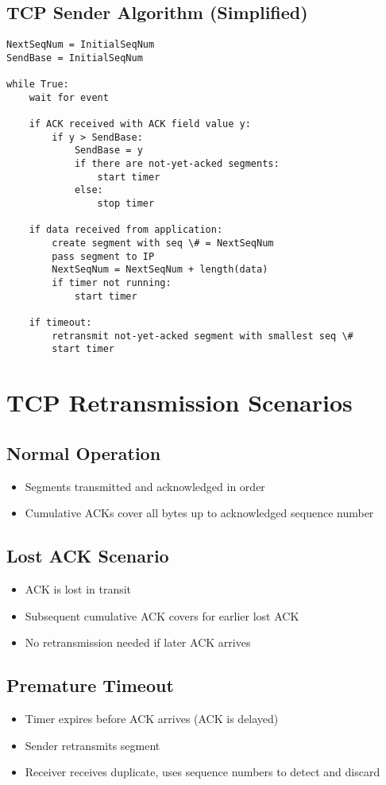 \documentclass[12pt]{article}
\begin{document}
\subsection{TCP Sender Algorithm (Simplified)}
\begin{verbatim}
NextSeqNum = InitialSeqNum
SendBase = InitialSeqNum

while True:
    wait for event
    
    if ACK received with ACK field value y:
        if y > SendBase:
            SendBase = y
            if there are not-yet-acked segments:
                start timer
            else:
                stop timer
                
    if data received from application:
        create segment with seq \# = NextSeqNum
        pass segment to IP
        NextSeqNum = NextSeqNum + length(data)
        if timer not running:
            start timer
            
    if timeout:
        retransmit not-yet-acked segment with smallest seq \#
        start timer
\end{verbatim}


\section{TCP Retransmission Scenarios}

\subsection{Normal Operation}
\begin{itemize}
    \item Segments transmitted and acknowledged in order
    \item Cumulative ACKs cover all bytes up to acknowledged sequence number
\end{itemize}

\subsection{Lost ACK Scenario}
\begin{itemize}
    \item ACK is lost in transit
    \item Subsequent cumulative ACK covers for earlier lost ACK
    \item No retransmission needed if later ACK arrives
\end{itemize}

\subsection{Premature Timeout}
\begin{itemize}
    \item Timer expires before ACK arrives (ACK is delayed)
    \item Sender retransmits segment
    \item Receiver receives duplicate, uses sequence numbers to detect and discard
\end{itemize}
\end{document}
